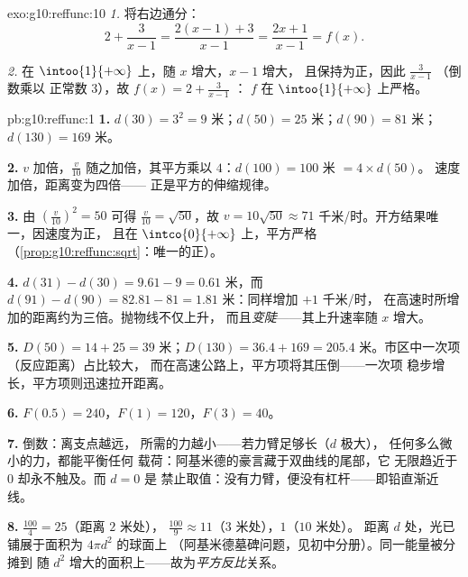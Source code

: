 \begin{solution}{exo:g10:reffunc:10}
\emph{1.} 将右边通分：
\[
2 + \frac{3}{x-1} = \frac{2(x-1) + 3}{x - 1} = \frac{2x + 1}{x - 1}
= f(x).
\]

\emph{2.} 在 $\intoo{1}{+\infty}$ 上，随 $x$ 增大，$x - 1$ 增大，
且保持为正，因此 $\frac{3}{x-1}$ （倒数乘以
正常数 $3$），故 $f(x) = 2 + \frac{3}{x-1}$ ：
$f$ 在 $\intoo{1}{+\infty}$ 上严格。
\end{solution}

\begin{solution}{pb:g10:reffunc:1}
\textbf{1.} $d(30) = 3^2 = 9$ 米；$d(50) = 25$ 米；$d(90) =
81$ 米；$d(130) = 169$ 米。

\textbf{2.} $v$ 加倍，$\frac v{10}$ 随之加倍，其平方乘以
$4$：$d(100) = 100$ 米 $= 4 \times d(50)$。
速度加倍，距离变为四倍——
正是平方的伸缩规律。

\textbf{3.} 由 $\left(\frac{v}{10}\right)^2 = 50$ 可得
$\frac{v}{10} = \sqrt{50}$，故 $v = 10\sqrt{50} \approx 71$
千米/时。开方结果唯一，因速度为正，
且在
$\intco{0}{+\infty}$ 上，平方严格
（\cref{prop:g10:reffunc:sqrt}：唯一的正）。

\textbf{4.} $d(31) - d(30) = 9.61 - 9 = 0.61$ 米，而
$d(91) - d(90) = 82.81 - 81 = 1.81$ 米：同样增加 $+1$ 千米/时，
在高速时所增加的距离约为三倍。抛物线不仅上升，
而且\emph{变陡}——其上升速率随 $x$ 增大。

\textbf{5.} $D(50) = 14 + 25 = 39$ 米；$D(130) = 36.4 + 169 =
205.4$ 米。市区中一次项（反应距离）占比较大，
而在高速公路上，平方项将其压倒——一次项
稳步增长，平方项则迅速拉开距离。

\textbf{6.} $F(0.5) = 240$，$F(1) = 120$，$F(3) = 40$。

\textbf{7.} 倒数：离支点越远，
所需的力越小——若力臂足够长（$d$ 极大），
任何多么微小的力，都能平衡任何
载荷：阿基米德的豪言藏于双曲线的尾部，它
无限趋近于 $0$ 却永不触及。而 $d = 0$ 是
禁止取值：没有力臂，便没有杠杆——即铅直渐近线。

\textbf{8.} $\frac{100}{4} = 25$（距离 $2$ 米处），
$\frac{100}{9} \approx 11$（$3$ 米处），$1$（$10$ 米处）。
距离 $d$ 处，光已铺展于面积为 $4\pi d^2$ 的球面上
（阿基米德墓碑问题，见初中分册）。同一能量被分摊到
随 $d^2$ 增大的面积上——故为\emph{平方反比}关系。


\end{solution}
